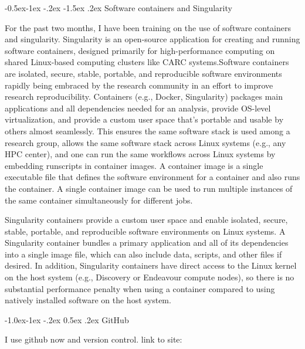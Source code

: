 \documentclass[11pt,]{article}
\makeatletter
\let\oldparagraph\paragraph
\renewcommand{\paragraph}[1]{\oldparagraph{#1}\mbox{}}
\renewcommand\subsubsection{
  \@startsection{subsubsection}{3}{\z@}
    {-1.0ex\@plus -1ex \@minus -.2ex}%
    {0.5ex \@plus .2ex}%
    {\normalfont\normalsize\bf}} %
\renewcommand\paragraph{
  \@startsection{paragraph}{4}{\z@}
    {-0.5ex\@plus -1ex \@minus -.2ex}%
    {-1.5ex \@plus .2ex}%
    {\normalfont\normalsize\bf}} %
\makeatother
\begin{document}
\hypertarget{software-containers-and-singularity}{%
\paragraph{Software containers and Singularity}\label{software-containers-and-singularity}}

For the past two months, I have been training on the use of software containers and singularity.
Singularity is an open-source application for creating and running software containers, designed primarily for high-performance computing on shared Linux-based computing clusters like CARC systems.Software containers are isolated, secure, stable, portable, and reproducible software environments rapidly being embraced by the research community in an effort to improve research reproducibility.
Containers (e.g., Docker, Singularity) packages main applications and all dependencies needed for an analysis, provide OS-level virtualization, and provide a custom user space that's portable and usable by others almost seamlessly.
This ensures the same software stack is used among a research group, allows the same software stack across Linux systems (e.g., any HPC center), and one can run the same workflows across Linux systems by embedding runscripts in container images.
A container image is a single executable file that defines the software environment for a container and also runs the container.
A single container image can be used to run multiple instances of the same container simultaneously for different jobs.

Singularity containers provide a custom user space and enable isolated, secure, stable, portable, and reproducible software environments on Linux systems.
A Singularity container bundles a primary application and all of its dependencies into a single image file, which can also include data, scripts, and other files if desired.
In addition, Singularity containers have direct access to the Linux kernel on the host system (e.g., Discovery or Endeavour compute nodes), so there is no substantial performance penalty when using a container compared to using natively installed software on the host system.

\hypertarget{github}{%
\subsubsection{GitHub}\label{github}}

I use github now and version control.
link to site:\\
\end{document}
